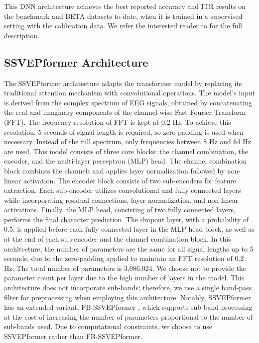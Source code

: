 \documentclass[12pt]{iopart}
\begin{document}
This DNN architecture achieves the best reported accuracy and ITR results on the benchmark \cite{benchmark_Dataset} and BETA \cite{beta} datasets to date, when it is trained in a supervised setting with the calibration data. We refer the interested reader to \cite{ournetwork} for the full description.




\subsection{SSVEPformer Architecture}
The SSVEPformer architecture adapts the transformer model \cite{transformer_attention} by replacing its traditional attention mechanism with convolutional operations. The model's input is derived from the complex spectrum of EEG signals, obtained by concatenating the real and imaginary components of the channel-wise Fast Fourier Transform (FFT). The frequency resolution of FFT is kept at 0.2 Hz. To achieve this resolution, 5 seconds of signal length is required, so zero-padding is used when necessary. Instead of the full spectrum, only frequencies between 8 Hz and 64 Hz are used. This model consists of three core blocks: the channel combination, the encoder, and the multi-layer perceptron (MLP) head. The channel combination block combines the channels and applies layer normalization \cite{ba2016layernormalization} followed by non-linear activation. The encoder block consists of two sub-encoders for feature extraction. Each sub-encoder utilizes convolutional and fully connected layers while incorporating residual connections, layer normalization, and non-linear activations. Finally, the MLP head, consisting of two fully connected layers, performs the final character prediction. The dropout \cite{dropout_paper} layer, with a probability of 0.5, is applied before each fully connected layer in the MLP head block, as well as at the end of each sub-encoder and the channel combination block. In this architecture, the number of parameters are the same for all signal lengths up to 5 seconds, due to the zero-padding applied to maintain an FFT resolution of 0.2 Hz. The total number of parameters is 3,086,024. We choose not to provide the parameter count per layer due to the high number of layers in the model. This architecture does not incorporate sub-bands; therefore, we use a single band-pass filter for preprocessing when employing this architecture. Notably, SSVEPformer has an extended variant, FB-SSVEPformer \cite{ssvepformer}, which supports sub-band processing at the cost of increasing the number of parameters proportional to the number of sub-bands used. Due to computational constraints, we choose to use SSVEPformer rather than FB-SSVEPformer.
\end{document}
